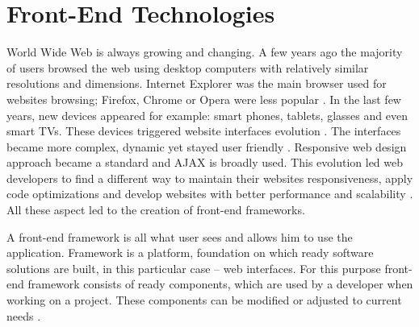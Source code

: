 \section{Front-End Technologies}
World Wide Web is always growing and changing. A few years ago the majority of users browsed the web using desktop computers with relatively similar resolutions and dimensions. Internet Explorer was the main browser used for websites browsing; Firefox, Chrome or Opera were less popular \cite{FrontEndSKI}. In the last few years, new devices appeared for example: smart phones, tablets, glasses and even smart TVs. These devices triggered website interfaces evolution \cite{FrontEndSKI}. The interfaces became more complex, dynamic yet stayed user friendly \cite{FrontEndSKI}. Responsive web design approach became a standard and AJAX is broadly used. This evolution led web developers to find a different way to maintain their websites responsiveness, apply code optimizations and develop websites with better performance and scalability \cite{FrontEndSKI}. All these aspect led to the creation of front-end frameworks.

A front-end framework is all what user sees and allows him to use the application. Framework is a platform, foundation on which ready software solutions are built, in this particular case – web interfaces. For this purpose front-end framework consists of ready components, which are used by a developer when working on a project. These components can be modified or adjusted to current needs \cite{FrontEndSKI}.
